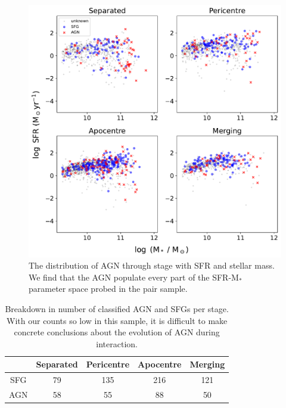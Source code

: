 \begin{figure}
\centering
\includegraphics[width=\textwidth]{Chapter3/figures/agn-stage-dist.pdf}
\caption[The distribution of AGN through stage with SFR and stellar mass.]{The distribution of AGN through stage with SFR and stellar mass. We find that the AGN populate every part of the SFR-M$_{*}$ parameter space probed in the pair sample.}
\label{fig:agn-stage}
\end{figure}

\begin{table}
\centering
\begin{tabular}{|c|c|c|c|c|}
\hline
& Separated & Pericentre & Apocentre & Merging \\
\hline
SFG & 79 & 135 & 216 & 121 \\
AGN & 58 & 55 & 88 & 50 \\
\hline
\end{tabular}
\caption{Breakdown in number of classified AGN and SFGs per stage. With our counts so low in this sample, it is difficult to make concrete conclusions about the evolution of AGN during interaction.}
\label{tab:agn-sfg-breakdown}
\end{table}


